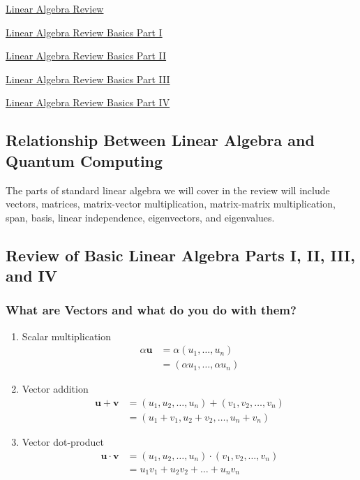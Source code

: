 \documentclass[main.tex]{subfiles}
\begin{document}
\href{https://www2.seas.gwu.edu/~simhaweb/quantum/modules/review/lin-review/lin-review.html}{Linear Algebra Review}

\href{https://www2.seas.gwu.edu/~simhaweb/lin/modules/review/review1.html}{Linear Algebra Review Basics Part I}

\href{https://www2.seas.gwu.edu/~simhaweb/lin/modules/review/review2.html}{Linear Algebra Review Basics Part II}

\href{https://www2.seas.gwu.edu/~simhaweb/lin/modules/review/review3.html}{Linear Algebra Review Basics Part III}

\href{https://www2.seas.gwu.edu/~simhaweb/lin/modules/review/review4.html}{Linear Algebra Review Basics Part IV}

\subsection{Relationship Between Linear Algebra and Quantum Computing}

The parts of standard linear algebra we will cover in the review will include vectors, matrices, matrix-vector multiplication, matrix-matrix multiplication, span, basis, linear independence, eigenvectors, and eigenvalues.

\subsection{Review of Basic Linear Algebra Parts I, II, III, and IV}
    
    \subsubsection{What are Vectors and what do you do with them?}
    
    \begin{enumerate}[]
        \item Scalar multiplication $$\begin{aligned} \alpha \mathbf{u} &=\alpha\left(u_{1}, \ldots, u_{n}\right) \\ &=\left(\alpha u_{1}, \ldots, \alpha u_{n}\right) \end{aligned}$$
        
        \item Vector addition $$\begin{aligned} \mathbf{u}+\mathbf{v} &=\left(u_{1}, u_{2}, \ldots, u_{n}\right)+\left(v_{1}, v_{2}, \ldots, v_{n}\right) \\ &= \left(u_{1}+v_{1}, u_{2}+v_{2}, \ldots, u_{n}+v_{n}\right) \end{aligned}$$
        
        \item Vector dot-product $$\begin{aligned} \mathbf{u} \cdot \mathbf{v} &=\left(u_{1}, u_{2}, \ldots, u_{n}\right) \cdot\left(v_{1}, v_{2}, \ldots, v_{n}\right) \\ &=u_{1} v_{1}+u_{2} v_{2}+\ldots+u_{n} v_{n} \end{aligned}$$
    \end{enumerate}
    
\end{document}
